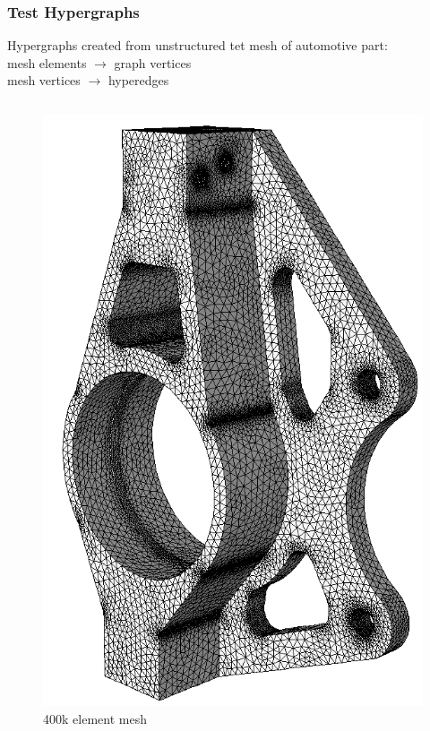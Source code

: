 \documentclass{beamer}
\begin{document}
\begin{frame}
  \frametitle{Test Hypergraphs}
  Hypergraphs created from unstructured tet mesh of automotive part: \\
  mesh elements $\rightarrow$ graph vertices \\
  mesh vertices $\rightarrow$ hyperedges
  \begin{columns}

    \begin{column}{0.5\textwidth}
      \begin{figure}
        \centering
        \includegraphics[width=.6\textwidth]{figures/upright400k.png}\\
        400k element mesh
      \end{figure}
    \end{column}


\end{columns}
\end{frame}
\end{document}
